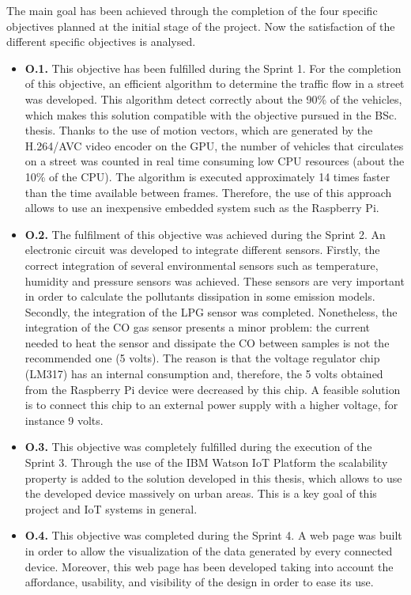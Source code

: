 The main goal has been achieved through the completion of the four specific objectives planned at the initial stage of the project. Now the satisfaction of the different specific objectives is analysed.
\begin{itemize}
	\item \textbf{O.1.} This objective has been fulfilled during the Sprint 1. For the completion of this objective, an efficient algorithm to determine the traffic flow in a street was developed. This algorithm detect correctly about the 90\% of the vehicles, which makes this solution compatible with the objective pursued in the \ac{BSc.} thesis. Thanks to the use of motion vectors, which are generated by the H.264/AVC video encoder on the \ac{GPU}, the number of vehicles that circulates on a street was counted in real time consuming low \ac{CPU} resources (about the 10\% of the \ac{CPU}). The algorithm is executed approximately 14 times faster than the time available between frames. Therefore, the use of this approach allows to use an inexpensive embedded system such as the Raspberry Pi.
	
	\item \textbf{O.2.} The fulfilment of this objective was achieved during the Sprint 2. An electronic circuit was developed to integrate different sensors. Firstly, the correct integration of several environmental sensors such as temperature, humidity and pressure sensors was achieved. These sensors are very important in order to calculate the pollutants dissipation in some emission models. Secondly, the integration of the LPG sensor was completed. Nonetheless, the integration of the CO gas sensor presents a minor problem: the current needed to heat the sensor and dissipate the CO between samples is not the recommended one (5 volts). The reason is that the voltage regulator chip (LM317) has an internal consumption and, therefore, the 5 volts obtained from the Raspberry Pi device were decreased by this chip. A feasible solution is to connect this chip to an external power supply with a higher voltage, for instance 9 volts.
	
	\item \textbf{O.3.} This objective was completely fulfilled during the execution of the Sprint 3. Through the use of the IBM Watson IoT Platform the scalability property is added to the solution developed in this thesis, which allows to use the developed device massively on urban areas. This is a key goal of this project and \ac{IoT} systems in general.
	
	\item \textbf{O.4.} This objective was completed during the Sprint 4. A web page was built in order to allow the visualization of the data generated by every connected device. Moreover, this web page has been developed taking into account the affordance, usability, and visibility of the design in order to ease its use.
\end{itemize}


